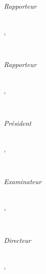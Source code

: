 \begin{titlepage}
    \vfill
    \begin{minipage}[t]{.21\textwidth}
        \raggedleft
        {\small \textit{Rapporteur}}
    \end{minipage}
    \hspace*{15pt}
    \begin{minipage}[t]{.7\textwidth}
        {\large \thesisFirstReviewer} \\
        {\small \thesisFirstReviewerTitle},
        {\small \thesisFirstReviewerUniversity}
    \end{minipage} \\[5mm]
    \begin{minipage}[t]{.21\textwidth}
        \raggedleft
        {\small \textit{Rapporteur}}
    \end{minipage}
    \hspace*{15pt}
    \begin{minipage}[t]{.7\textwidth}
        {\large \thesisSecondReviewer} \\
        {\small \thesisSecondReviewerTitle},
        {\small \thesisSecondReviewerUniversity}
    \end{minipage} \\[5mm]
    \begin{minipage}[t]{.21\textwidth}
        \raggedleft
        {\small \textit{Président}}
    \end{minipage}
    \hspace*{15pt}
    \begin{minipage}[t]{.7\textwidth}
        {\large \thesisPresident} \\
        {\small \thesisPresidentTitle},
        {\small \thesisPresidentUniversity}
    \end{minipage} \\[5mm]
    \begin{minipage}[t]{.21\textwidth}
        \raggedleft
        {\small \textit{Examinateur}}
    \end{minipage}
    \hspace*{15pt}
    \begin{minipage}[t]{.7\textwidth}
        {\large \thesisExaminator} \\
        {\small \thesisExaminatorTitle},
        {\small \thesisExaminatorUniversity}
    \end{minipage} \\[5mm]

    \begin{minipage}[t]{.21\textwidth}
        \raggedleft
        {\small \textit{Directeur}}
    \end{minipage}
    \hspace*{15pt}
    \begin{minipage}[t]{.7\textwidth}
        {\large \thesisFirstSupervisor}\\
        {\small \thesisUniversityTitle},
        {\small \thesisUniversity}
    \end{minipage} \\[15mm]

    \thesisDateFr \\

\end{titlepage}


